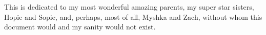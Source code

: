 
This is dedicated to my most wonderful amazing parents, my super star sisters, Hopie and Sopie, and, perhaps, most of all, Myshka and Zach, without whom this document would and my sanity would not exist.